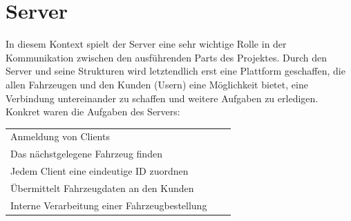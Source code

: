 \section{Server}
In diesem Kontext spielt der Server eine sehr wichtige Rolle in der Kommunikation zwischen den ausführenden Parts des Projektes. Durch den Server und seine Strukturen wird letztendlich erst eine Plattform geschaffen, die allen Fahrzeugen und den Kunden (Usern) eine Möglichkeit bietet, eine Verbindung untereinander zu schaffen und weitere Aufgaben zu erledigen. Konkret waren die Aufgaben des Servers:
\begin{table}[h]
\begin{tabular}{lcr}
Anmeldung von Clients\\
Das nächstgelegene Fahrzeug finden\\
Jedem Client eine eindeutige ID zuordnen \\
Übermittelt Fahrzeugdaten an den Kunden\\
Interne Verarbeitung einer Fahrzeugbestellung\\
\end{tabular}
\end{table}
